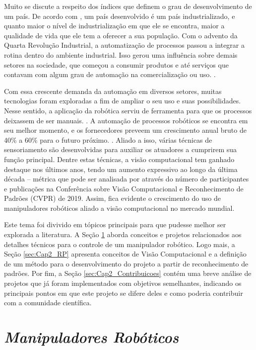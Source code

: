 


Muito se discute a respeito dos índices que definem o grau de desenvolvimento de um país. De acordo com \cite{paranhos2007gestao}, um país desenvolvido é um país industrializado, e quanto maior o nível de industrialização em que ele se encontra, maior a qualidade de vida que ele tem a oferecer a sua população. Com o advento da Quarta Revolução Industrial, a automatização de processos passou a integrar a rotina dentro do ambiente industrial. Isso gerou uma influência sobre demais setores na sociedade, que começou a consumir produtos e até serviços que contavam com algum grau de automação na comercialização ou uso. \cite{schwab2019quarta}.

Com essa crescente demanda da automação em diversos setores, muitas tecnologias foram exploradas a fim de ampliar o seu uso e suas possibilidades. Nesse sentido, a aplicação da robótica serviu de ferramenta para que os processos deixassem de ser manuais. \cite{bastos2014aplicaccao}. A automação de processos robóticos se encontra em seu melhor momento, e os fornecedores preveem um crescimento anual bruto de 40\% a 60\% para o futuro próximo. \cite{saukkonen2020robotic}. Aliado a isso, várias técnicas de sensoriamento são desenvolvidas para auxiliar os atuadores a cumprirem sua função principal. Dentre estas técnicas, a visão computacional tem ganhado destaque nos últimos anos, tendo um aumento expressivo ao longo da última década – métrica que pode ser analisada por \cite{su2021affective} através do número de participantes e publicações na Conferência sobre Visão Computacional e Reconhecimento de Padrões (CVPR) de 2019. Assim, fica evidente o crescimento do uso de manipuladores robóticos aliado a visão computacional no mercado mundial.

Este tema foi divivido em tópicos principais para que pudesse melhor ser explorada a literatura. A Seção \ref{sec:Cap2_MR} aborda conceitos e projetos relacionados aos detalhes técnicos para o controle de um manipulador robótico. Logo mais, a Seção \ref{sec:Cap2_RP} apresenta conceitos de Visão Computacional e a definição de um método para o desenvolvimento do projeto a partir de reconhecimento de padrões. Por fim, a Seção \ref{sec:Cap2_Contribuicoes} contém uma breve análise de projetos que já foram implementados com objetivos semelhantes, indicando os principais pontos em que este projeto se difere deles e como poderia contribuir com a comunidade científica.


\section{\textit{Manipuladores Robóticos}}\label{sec:Cap2_MR}

